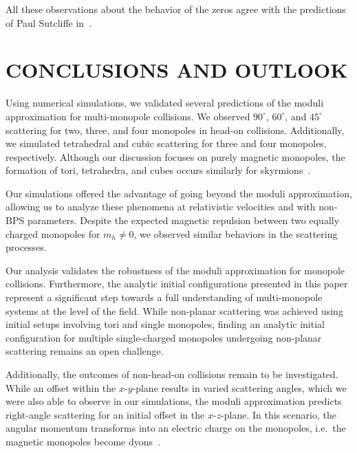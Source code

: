 \documentclass[aps, prd, twocolumn, superscriptaddress, preprintnumbers, nofootinbib, longbibliography]{revtex4-1}
\begin{document}
All these observations about the behavior of the zeros agree with the predictions of Paul Sutcliffe in~\cite{Sutcliffe:1996he}.








\section{\MakeUppercase{Conclusions and outlook}}
\label{sec:outlook-and-conclusion}
Using numerical simulations, we validated several predictions of the moduli approximation for multi-monopole collisions. We observed $90^\circ$, $60^\circ$, and $45^\circ$ scattering for two, three, and four monopoles in head-on collisions. Additionally, we simulated tetrahedral and cubic scattering for three and four monopoles, respectively. Although our discussion focuses on purely magnetic monopoles, the formation of tori, tetrahedra, and cubes occurs similarly for skyrmions~\cite{Houghton:1997kg}.

Our simulations offered the advantage of going beyond the moduli approximation, allowing us to analyze these phenomena at relativistic velocities and with non-BPS parameters. Despite the expected magnetic repulsion between two equally charged monopoles for $m_h \neq 0$, we observed similar behaviors in the scattering processes. 


Our analysis validates the robustness of the moduli approximation for monopole collisions. Furthermore, the analytic initial configurations presented in this paper represent a significant step towards a full understanding of multi-monopole systems at the level of the field. While non-planar scattering was achieved using initial setups involving tori and single monopoles, finding an analytic initial configuration for multiple single-charged monopoles undergoing non-planar scattering remains an open challenge.

Additionally, the outcomes of non-head-on collisions remain to be investigated. While an offset within the $x$-$y$-plane results in varied scattering angles, which we were also able to observe in our simulations, the moduli approximation predicts right-angle scattering for an initial offset in the $x$-$z$-plane. In this scenario, the angular momentum transforms into an electric charge on the monopoles, i.e.~the magnetic monopoles become dyons~\cite{Gibbons:1986df, Atiyah-Hitchin1988}.
\end{document}
